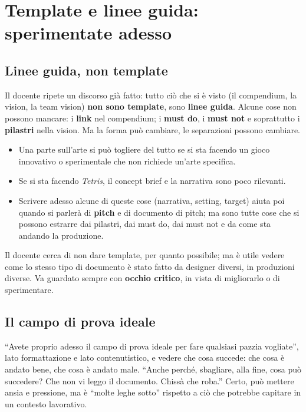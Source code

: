 \section{Template e linee guida: sperimentate adesso}
\label{gd9:sec:template}

\subsection{Linee guida, non template}

Il docente ripete un discorso già fatto: tutto ciò che si è visto (il
compendium, la vision, la team vision) \textbf{non sono template}, sono
\textbf{linee guida}. Alcune cose non possono mancare: i \textbf{link} nel
compendium; i \textbf{must do}, i \textbf{must not} e soprattutto i
\textbf{pilastri} nella vision. Ma la forma può cambiare, le separazioni
possono cambiare.
\begin{itemize}
  \item Una parte sull'arte si può togliere del tutto se si sta facendo un
        gioco innovativo o sperimentale che non richiede un'arte specifica.
  \item Se si sta facendo \emph{Tetris}, il concept brief e la narrativa
        sono poco rilevanti.
  \item Scrivere adesso alcune di queste cose (narrativa, setting, target)
        aiuta poi quando si parlerà di \textbf{pitch} e di documento di
        pitch; ma sono tutte cose che si possono estrarre dai pilastri, dai
        must do, dai must not e da come sta andando la produzione.
\end{itemize}
Il docente cerca di non dare template, per quanto possibile; ma è utile
vedere come lo stesso tipo di documento è stato fatto da designer diversi, in
produzioni diverse. Va guardato sempre con \textbf{occhio critico}, in vista
di migliorarlo o di sperimentare.

\subsection{Il campo di prova ideale}

``Avete proprio adesso il campo di prova ideale per fare qualsiasi pazzia
vogliate'', lato formattazione e lato contenutistico, e vedere che cosa
succede: che cosa è andato bene, che cosa è andato male. ``Anche perché,
sbagliare, alla fine, cosa può succedere? Che non vi leggo il documento.
Chissà che roba.'' Certo, può mettere ansia e pressione, ma è ``molte leghe
sotto'' rispetto a ciò che potrebbe capitare in un contesto lavorativo.

